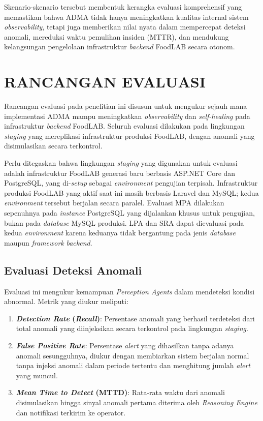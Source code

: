 Skenario-skenario tersebut membentuk kerangka evaluasi komprehensif yang memastikan bahwa ADMA tidak hanya meningkatkan kualitas internal sistem \textit{observability}, tetapi juga memberikan nilai nyata dalam mempercepat deteksi anomali, mereduksi waktu pemulihan insiden (MTTR), dan mendukung kelangsungan pengelolaan infrastruktur \textit{backend} FoodLAB secara otonom.

\section{RANCANGAN EVALUASI}

Rancangan evaluasi pada penelitian ini disusun untuk mengukur sejauh mana implementasi ADMA mampu meningkatkan \textit{observability} dan \textit{self-healing} pada infrastruktur \textit{backend} FoodLAB. Seluruh evaluasi dilakukan pada lingkungan \textit{staging} yang mereplikasi infrastruktur produksi FoodLAB, dengan anomali yang disimulasikan secara terkontrol.

Perlu ditegaskan bahwa lingkungan \textit{staging} yang digunakan untuk evaluasi adalah infrastruktur FoodLAB generasi baru berbasis ASP.NET Core dan PostgreSQL, yang di-\textit{setup} sebagai \textit{environment} pengujian terpisah. Infrastruktur produksi FoodLAB yang aktif saat ini masih berbasis Laravel dan MySQL; kedua \textit{environment} tersebut berjalan secara paralel. Evaluasi MPA dilakukan sepenuhnya pada \textit{instance} PostgreSQL yang dijalankan khusus untuk pengujian, bukan pada \textit{database} MySQL produksi. LPA dan SRA dapat dievaluasi pada kedua \textit{environment} karena keduanya tidak bergantung pada jenis \textit{database} maupun \textit{framework} \textit{backend}.

\subsection{Evaluasi Deteksi Anomali}

Evaluasi ini mengukur kemampuan \textit{Perception Agents} dalam mendeteksi kondisi abnormal. Metrik yang diukur meliputi:

\begin{enumerate}[label=\arabic*., leftmargin=*]
  \item \textbf{\textit{Detection Rate} (\textit{Recall})}: Persentase anomali yang berhasil terdeteksi dari total anomali yang diinjeksikan secara terkontrol pada lingkungan \textit{staging}.
  \item \textbf{\textit{False Positive Rate}}: Persentase \textit{alert} yang dihasilkan tanpa adanya anomali sesungguhnya, diukur dengan membiarkan sistem berjalan normal tanpa injeksi anomali dalam periode tertentu dan menghitung jumlah \textit{alert} yang muncul.
  \item \textbf{\textit{Mean Time to Detect} (MTTD)}: Rata-rata waktu dari anomali disimulasikan hingga sinyal anomali pertama diterima oleh \textit{Reasoning Engine} dan notifikasi terkirim ke operator.
\end{enumerate}

